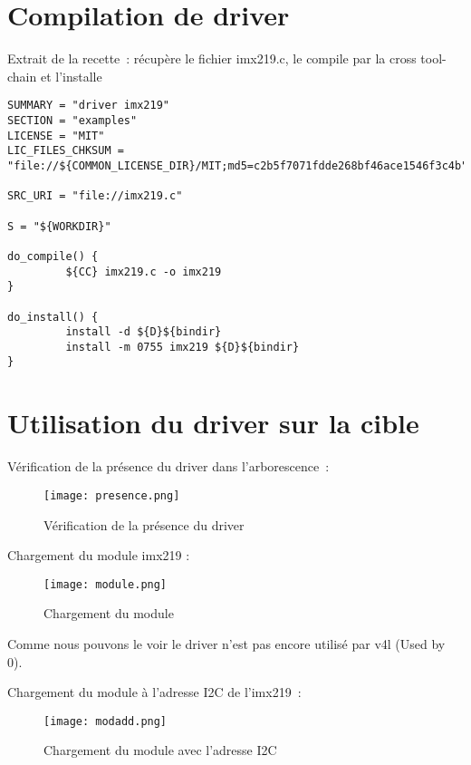 \section{Compilation de driver}
Extrait de la recette : récupère le fichier imx219.c, le compile par la cross
tool-chain et l’installe

\begin{lstlisting}
SUMMARY = "driver imx219"
SECTION = "examples"
LICENSE = "MIT"
LIC_FILES_CHKSUM = "file://${COMMON_LICENSE_DIR}/MIT;md5=c2b5f7071fdde268bf46ace1546f3c4b"

SRC_URI = "file://imx219.c"

S = "${WORKDIR}"

do_compile() {
         ${CC} imx219.c -o imx219
}

do_install() {
         install -d ${D}${bindir}
         install -m 0755 imx219 ${D}${bindir}
}
\end{lstlisting}

\section{Utilisation du driver sur la cible}
Vérification de la présence du driver dans l’arborescence :

\begin{figure}[th]
    \centering
    \texttt{[image: presence.png]}
    \decoRule
    \caption{Vérification de la présence du driver}  \label{fig:pres}
\end{figure}

Chargement du module imx219 :

\begin{figure}[th]
    \centering
    \texttt{[image: module.png]}
    \decoRule
    \caption{Chargement du module}  \label{fig:mod}
\end{figure}

Comme nous pouvons le voir le driver n’est pas encore utilisé par v4l (Used by 0).

\clearpage

Chargement du module à l’adresse I2C de l’imx219 :

\begin{figure}[th]
    \centering
    \texttt{[image: modadd.png]}
    \decoRule
    \caption{Chargement du module avec l'adresse I2C}  \label{fig:modadd}
\end{figure}

